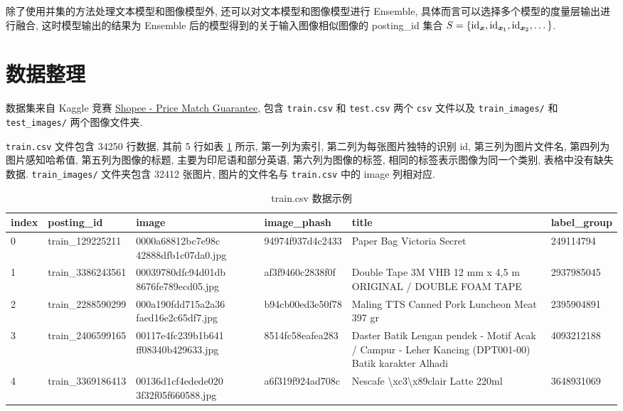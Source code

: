 \documentclass[12pt]{article}
\begin{document}
除了使用并集的方法处理文本模型和图像模型外, 还可以对文本模型和图像模型进行 Ensemble, 具体而言可以选择多个模型的度量层输出进行融合, 这时模型输出的结果为 Ensemble 后的模型得到的关于输入图像相似图像的 posting\_id 集合 $S=\{\operatorname{id}_{\bm{x}},\operatorname{id}_{\bm{x}_1},\operatorname{id}_{\bm{x}_2},\dots\}$.

\section{数据整理}

数据集来自 Kaggle 竞赛 \href{https://www.kaggle.com/c/shopee-product-matching/overview}{Shopee - Price Match Guarantee}, 包含 \verb|train.csv| 和 \verb|test.csv| 两个 \verb|csv| 文件以及 \verb|train_images/| 和 \verb|test_images/| 两个图像文件夹. 

\verb|train.csv| 文件包含 34250 行数据, 其前 5 行如表 \ref{tab:train_csv_5} 所示, 第一列为索引, 第二列为每张图片独特的识别 id, 第三列为图片文件名, 第四列为图片感知哈希值, 第五列为图像的标题, 主要为印尼语和部分英语, 第六列为图像的标签, 相同的标签表示图像为同一个类别, 表格中没有缺失数据. \verb|train_images/| 文件夹包含 32412 张图片, 图片的文件名与 \verb|train.csv| 中的 image 列相对应.

\begin{table}[htbp]
  \footnotesize
  \centering
  \caption{train.csv 数据示例}
  \label{tab:train_csv_5}
  \begin{tabular}{p{0.5cm}p{2.5cm}p{3cm}p{2.7cm}p{4cm}p{1.9cm}}
    \toprule
    index & posting\_id       & image                                & image\_phash     & title                                                                                              & label\_group \\
    \midrule
    0 & train\_129225211  & 0000a68812bc7e98c 42888dfb1c07da0.jpg & 94974f937d4c2433 & Paper Bag Victoria Secret                                                                          & 249114794    \\
    1 & train\_3386243561 & 00039780dfc94d01db 8676fe789ecd05.jpg & af3f9460c2838f0f & Double Tape 3M VHB 12 mm x 4,5 m ORIGINAL / DOUBLE FOAM TAPE                                       & 2937985045   \\
    2 & train\_2288590299 & 000a190fdd715a2a36 faed16e2c65df7.jpg & b94cb00ed3e50f78 & Maling TTS Canned Pork Luncheon Meat 397 gr                                                        & 2395904891   \\
    3 & train\_2406599165 & 00117e4fc239b1b641 ff08340b429633.jpg & 8514fc58eafea283 & Daster Batik Lengan pendek - Motif Acak / Campur - Leher Kancing (DPT001-00) Batik karakter Alhadi & 4093212188   \\
    4 & train\_3369186413 & 00136d1cf4edede020 3f32f05f660588.jpg & a6f319f924ad708c & Nescafe \textbackslash{}xc3\textbackslash{}x89clair Latte 220ml                                    & 3648931069  \\
    \bottomrule
  \end{tabular}
\end{table}
\end{document}
